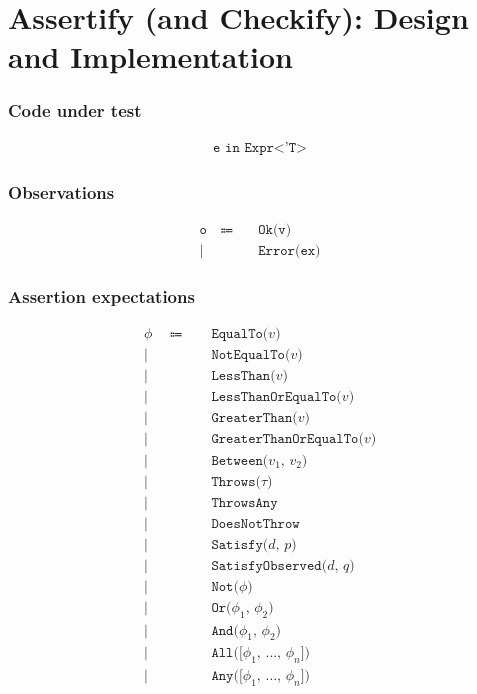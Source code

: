 \chapter{Assertify (and Checkify): Design and Implementation} %
\label{chpt:assertify-and-checkify-design-and-implementation} %


\subsection*{Code under test}
\begin{align*}
    \texttt{e in Expr<'T>}
\end{align*}

\subsection*{Observations}
\begin{align*}
    &&\texttt{o}\quad\Coloneqq& \quad\texttt{Ok(v)}&&\\
    &&|& \quad\texttt{Error(ex)}&&
\end{align*}

\subsection*{Assertion expectations}
\begin{align*}
    &&\phi\quad\Coloneqq& \quad\texttt{EqualTo($v$)}&&\\
    &&|& \quad\texttt{NotEqualTo($v$)}&&\\
    &&|& \quad\texttt{LessThan($v$)}&&\\
    &&|& \quad\texttt{LessThanOrEqualTo($v$)}&&\\
    &&|& \quad\texttt{GreaterThan($v$)}&&\\
    &&|& \quad\texttt{GreaterThanOrEqualTo($v$)}&&\\
    &&|& \quad\texttt{Between($v_1$, $v_2$)}&&\\
    &&|& \quad\texttt{Throws($\tau$)}&&\\
    &&|& \quad\texttt{ThrowsAny}&&\\
    &&|& \quad\texttt{DoesNotThrow}&&\\
    &&|& \quad\texttt{Satisfy($d$, $p$)}&&\\
    &&|& \quad\texttt{SatisfyObserved($d$, $q$)}&&\\
    &&|& \quad\texttt{Not($\phi$)}&&\\
    &&|& \quad\texttt{Or($\phi_1$, $\phi_2$)}&&\\
    &&|& \quad\texttt{And($\phi_1$, $\phi_2$)}&&\\
    &&|& \quad\texttt{All([$\phi_1$, \ldots, $\phi_n$])}&&\\
    &&|& \quad\texttt{Any([$\phi_1$, \ldots, $\phi_n$])}&&
\end{align*}

